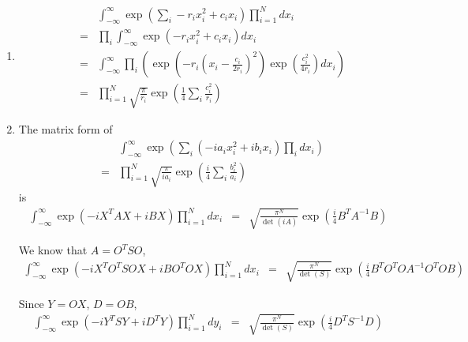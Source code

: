 \documentclass[12pt,a4paper]{article}
\begin{document}
\begin{enumerate}








\item
\begin{eqnarray*}
	&&\int_{-\infty}^\infty \exp\left(\sum_i - r_i x_i^2 + c_i x_i\right) \prod_{i=1}^N  d x_i \\
	&=& \prod_i \int_{-\infty}^\infty \exp\left( -r_ix_i^2 + c_i x_i \right) d x_i \\
	&=& \int_{-\infty}^{\infty} \prod_i \left( \exp\left( -r_i (x_i - \frac{c_i}{2r_i})^2 \right)\exp\left( \frac{c_i^2}{4r_i} \right) d x_i \right) \\
	&=& \prod _{i=1}^N \sqrt{\frac{\pi}{r_i}} \exp\left( \frac14 \sum_i \frac{c_i^2}{r_i} \right)
\end{eqnarray*}





\item

The matrix form of
\begin{eqnarray*}
	&&\int_{-\infty}^{\infty} \exp\left( \sum_i ( -i a_i x_i^2  + i b_i x_i  )\prod _i  d  x_i \right) \\
	&=& \prod_{i=1}^N \sqrt{\frac{\pi}{ia_i}}\exp\left( \frac{i}{4} \sum_i \frac{b_i^2}{a_i} \right)
\end{eqnarray*}
is
\begin{eqnarray*}
	\int_{-\infty}^{\infty} \exp\left( -i X^T A X + i B X \right) \prod_{i=1}^N  d x_i &=& \sqrt{\frac{\pi^N}{\det(iA)}}  \exp\left( \frac{i}{4} B^T A^{-1}B \right)
\end{eqnarray*}

We know that $A = O^T S O$,
\begin{eqnarray*}
	\int_{-\infty}^\infty \exp\left( -i X^T O^T S O X + i B O^T O X \right)\prod_{i=1}^N  d x_i &=& \sqrt{\frac{\pi^N}{\det(S)}} \exp\left( \frac i 4  B^T O^T O A^{-1} O^T O B \right)
\end{eqnarray*}

Since $Y=OX$, $D=OB$,
\begin{eqnarray*}
	\int_{-\infty}^\infty \exp\left( -i Y^T S Y +  i D^T Y \right)\prod_{i=1}^N  d y_i &=& \sqrt{\frac{\pi^N}{\det(S)}} \exp\left( \frac i 4 D^T S^{-1} D \right) 
\end{eqnarray*}






\end{enumerate}
\end{document}
